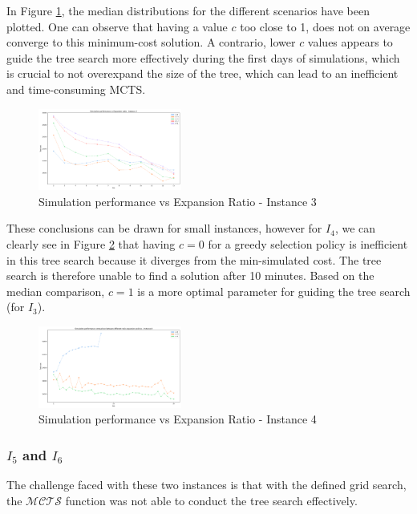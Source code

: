 \documentclass[conference]{IEEEtran}
\begin{document}
In Figure \ref{fig:sim_perf_vs_c_3}, the median distributions for the different scenarios have been plotted. One can observe that having a value $c$ too close to 1, does not on average converge to this minimum-cost solution. A contrario, lower $c$ values appears to guide the tree search more effectively during the first days of simulations, which is crucial to not overexpand the size of the tree, which can lead to an inefficient and time-consuming MCTS.
\begin{figure}[!ht]
    \centering
    \includegraphics[width=0.42\textwidth]{Figures/3 - Simulation performance vs Expansion ratio.png}
    \caption{Simulation performance vs Expansion Ratio - Instance 3}
    \label{fig:sim_perf_vs_c_3}
\end{figure}

These conclusions can be drawn for small instances, however for $I_4$, we can clearly see in Figure \ref{fig:sim_perf_vs_c_4} that having $c=0$ for a greedy selection policy is inefficient in this tree search because it diverges from the min-simulated cost. The tree search is therefore unable to find a solution after 10 minutes. Based on the median comparison, $c=1$ is a more optimal parameter for guiding the tree search (for $I_3$).
\begin{figure}[!ht]
    \centering
    \includegraphics[width=0.42\textwidth]{Figures/4 - Simulation performance vs Expansion ratio.png}
    \caption{Simulation performance vs Expansion Ratio - Instance 4}
    \label{fig:sim_perf_vs_c_4}
\end{figure}


\subsubsection{$I_5$ and $I_6$}

The challenge faced with these two instances is that with the defined grid search, the $\mathcal{MCTS}$ function was not able to conduct the tree search effectively.
\end{document}
